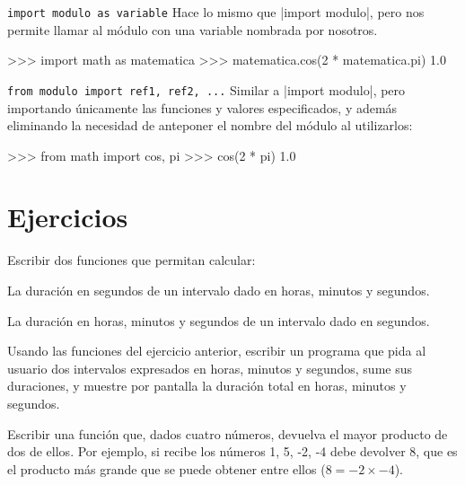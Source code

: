 \begin{referencia_python}
\begin{sintaxis}{\lstinline!import modulo as variable!}
Hace lo mismo que |import modulo|, pero nos permite llamar al módulo con
una variable nombrada por nosotros.
\begin{codigo-python-sn}
>>> import math as matematica
>>> matematica.cos(2 * matematica.pi)
1.0
\end{codigo-python-sn}
\end{sintaxis}

\begin{sintaxis}{\lstinline!from modulo import ref1, ref2, ...!}
Similar a |import modulo|, pero importando únicamente las funciones y valores
especificados, y además eliminando la necesidad de anteponer el nombre del
módulo al utilizarlos:
\begin{codigo-python-sn}
>>> from math import cos, pi
>>> cos(2 * pi)
1.0
\end{codigo-python-sn}
\end{sintaxis}

\end{referencia_python}

\newpage
\section{Ejercicios}

\begin{ejercicio} Escribir dos funciones que permitan calcular:
\begin{partes}
    \item La duración en segundos de un intervalo dado en horas, minutos y segundos.
    \item La duración en horas, minutos y segundos de un intervalo dado en segundos.
\end{partes}
\end{ejercicio}

\begin{ejercicio}
Usando las funciones del ejercicio anterior, escribir un programa que pida al
usuario dos intervalos expresados en horas, minutos y segundos, sume sus
duraciones, y muestre por pantalla la duración total en horas, minutos y segundos.
\end{ejercicio}

\begin{ejercicio}
Escribir una función que, dados cuatro números, devuelva el mayor
producto de dos de ellos. Por ejemplo, si recibe los números 1, 5, -2,
-4 debe devolver 8, que es el producto más grande que se puede obtener
entre ellos ($8 = -2 \times -4$).
\end{ejercicio}

